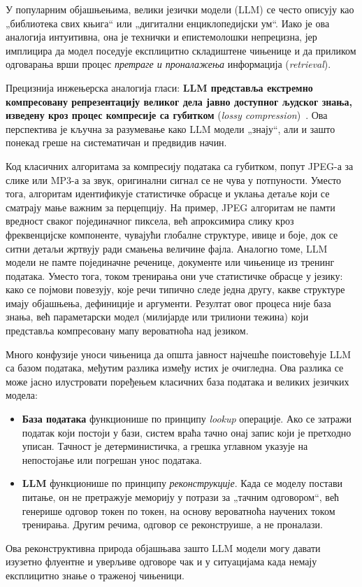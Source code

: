 У популарним објашњењима, велики језички модели (LLM) се често описују као
„библиотека свих књига“ или „дигитални енциклопедијски ум“.
Иако је ова аналогија интуитивна, она је технички и епистемолошки непрецизна,
јер имплицира да модел поседује експлицитно складиштене чињенице и да
приликом одговарања врши процес \textit{претраге и проналажења} информација
(\textit{retrieval}).

Прецизнија инжењерска аналогија гласи:
\textbf{LLM представља екстремно компресовану репрезентацију великог дела јавно доступног
људског знања, изведену кроз процес компресије са губитком}
(\textit{lossy compression})~\cite{bender2021,zhao2023llmsurvey}.
Ова перспектива је кључна за разумевање како LLM модели „знају“,
али и зашто понекад греше на систематичан и предвидив начин.

Код класичних алгоритама за компресију података са губитком,
попут JPEG-а за слике или MP3-а за звук,
оригинални сигнал се не чува у потпуности.
Уместо тога, алгоритам идентификује статистичке обрасце
и уклања детаље који се сматрају мање важним за перцепцију.
На пример, JPEG алгоритам не памти вредност сваког појединачног пиксела,
већ апроксимира слику кроз фреквенцијске компоненте,
чувајући глобалне структуре, ивице и боје,
док се ситни детаљи жртвују ради смањења величине фајла.
Аналогно томе, LLM модели не памте појединачне реченице,
документе или чињенице из тренинг података.
Уместо тога, током тренирања они уче
статистичке обрасце у језику:
како се појмови повезују, које речи типично следе једна другу,
какве структуре имају објашњења, дефиниције и аргументи.
Резултат овог процеса није база знања,
већ параметарски модел (милијарде или трилиони тежина)
који представља компресовану мапу вероватноћа над језиком.

Много конфузије уноси чињеница да општа јавност најчешће поистовећује LLM са базом података, међутим разлика између истих је очигледна.
Ова разлика се може јасно илустровати поређењем класичних база података
и великих језичких модела:

\begin{itemize}
    \item \textbf{База података} функционише по принципу
    \textit{lookup} операције.
    Ако се затражи податак који постоји у бази,
    систем враћа тачно онај запис који је претходно уписан.
    Тачност је детерминистичка, а грешка углавном указује на
    непостојање или погрешан унос података.

    \item \textbf{LLM} функционише по принципу
    \textit{реконструкције}.
    Када се моделу постави питање,
    он не претражује меморију у потрази за „тачним одговором“,
    већ генерише одговор токен по токен,
    на основу вероватноћа научених током тренирања.
    Другим речима, одговор се реконструише,
    а не проналази.
\end{itemize}
\noindent
Ова реконструктивна природа објашњава зашто LLM модели могу
давати изузетно флуентне и уверљиве одговоре чак и у ситуацијама
када немају експлицитно знање о траженој чињеници. 

